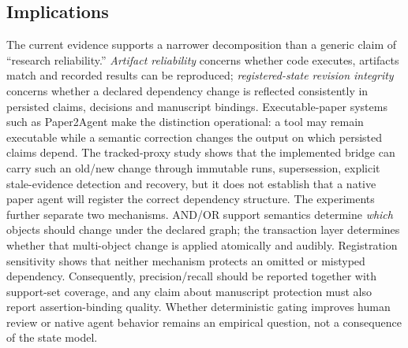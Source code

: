 \documentclass[cmc,article,submit,moreauthors,pdftex]{Definitions/tsp}
\begin{document}
\subsection{Implications}
The current evidence supports a narrower decomposition than a generic claim of ``research reliability.'' \emph{Artifact reliability} concerns whether code executes, artifacts match and recorded results can be reproduced; \emph{registered-state revision integrity} concerns whether a declared dependency change is reflected consistently in persisted claims, decisions and manuscript bindings. Executable-paper systems such as Paper2Agent make the distinction operational: a tool may remain executable while a semantic correction changes the output on which persisted claims depend. The tracked-proxy study shows that the implemented bridge can carry such an old/new change through immutable runs, supersession, explicit stale-evidence detection and recovery, but it does not establish that a native paper agent will register the correct dependency structure. The experiments further separate two mechanisms. AND/OR support semantics determine \emph{which} objects should change under the declared graph; the transaction layer determines whether that multi-object change is applied atomically and audibly. Registration sensitivity shows that neither mechanism protects an omitted or mistyped dependency. Consequently, precision/recall should be reported together with support-set coverage, and any claim about manuscript protection must also report assertion-binding quality. Whether deterministic gating improves human review or native agent behavior remains an empirical question, not a consequence of the state model.
\end{document}
